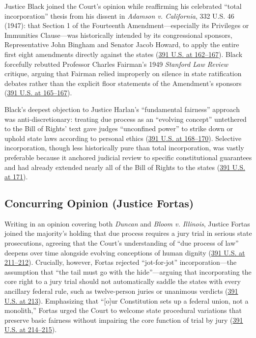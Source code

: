 \documentclass[12pt]{article}
\begin{document}
Justice Black joined the Court's opinion while reaffirming his celebrated ``total incorporation'' thesis from his dissent in \textit{Adamson v. California}, 332 U.S. 46 (1947): that Section 1 of the Fourteenth Amendment---especially its Privileges or Immunities Clause---was historically intended by its congressional sponsors, Representative John Bingham and Senator Jacob Howard, to apply the entire first eight amendments directly against the states (\href{https://supreme.justia.com/cases/federal/us/391/145/}{391 U.S. at 162--167}). Black forcefully rebutted Professor Charles Fairman's 1949 \textit{Stanford Law Review} critique, arguing that Fairman relied improperly on silence in state ratification debates rather than the explicit floor statements of the Amendment's sponsors (\href{https://supreme.justia.com/cases/federal/us/391/145/}{391 U.S. at 165--167}).

Black's deepest objection to Justice Harlan's ``fundamental fairness'' approach was anti-discretionary: treating due process as an ``evolving concept'' untethered to the Bill of Rights' text gave judges ``unconfined power'' to strike down or uphold state laws according to personal ethics (\href{https://supreme.justia.com/cases/federal/us/391/145/}{391 U.S. at 168--170}). Selective incorporation, though less historically pure than total incorporation, was vastly preferable because it anchored judicial review to specific constitutional guarantees and had already extended nearly all of the Bill of Rights to the states (\href{https://supreme.justia.com/cases/federal/us/391/145/}{391 U.S. at 171}).

\subsection{Concurring Opinion (Justice Fortas)}

Writing in an opinion covering both \textit{Duncan} and \textit{Bloom v. Illinois}, Justice Fortas joined the majority's holding that due process requires a jury trial in serious state prosecutions, agreeing that the Court's understanding of ``due process of law'' deepens over time alongside evolving conceptions of human dignity (\href{https://supreme.justia.com/cases/federal/us/391/194/}{391 U.S. at 211--212}). Crucially, however, Fortas rejected ``jot-for-jot'' incorporation---the assumption that ``the tail must go with the hide''---arguing that incorporating the core right to a jury trial should not automatically saddle the states with every ancillary federal rule, such as twelve-person juries or unanimous verdicts (\href{https://supreme.justia.com/cases/federal/us/391/194/}{391 U.S. at 213}). Emphasizing that ``[o]ur Constitution sets up a federal union, not a monolith,'' Fortas urged the Court to welcome state procedural variations that preserve basic fairness without impairing the core function of trial by jury (\href{https://supreme.justia.com/cases/federal/us/391/194/}{391 U.S. at 214--215}).
\end{document}
